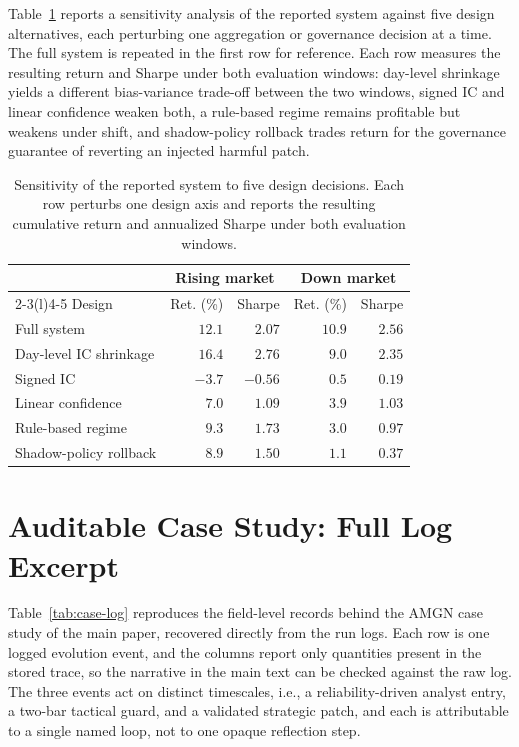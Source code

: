 \documentclass[letterpaper]{article}
\begin{document}
Table~\ref{tab:design} reports a sensitivity analysis of the reported
system against five design alternatives, each perturbing one aggregation
or governance decision at a time. The full system is repeated in the
first row for reference. Each row measures the resulting return and
Sharpe under both evaluation windows: day-level shrinkage yields a
different bias-variance trade-off between the two windows, signed IC and
linear confidence weaken both, a rule-based regime remains profitable
but weakens under shift, and shadow-policy rollback trades return for
the governance guarantee of reverting an injected harmful patch.

\begin{table}[tb]
\centering
\footnotesize
\setlength{\tabcolsep}{4pt}
\begin{tabular}{@{}l rr rr@{}}
\toprule
& \multicolumn{2}{c}{Rising market} & \multicolumn{2}{c}{Down market} \\
\cmidrule(lr){2-3}\cmidrule(l){4-5}
Design & Ret. (\%) & Sharpe & Ret. (\%) & Sharpe \\
\midrule
Full system            & $12.1$  & $2.07$  & $10.9$ & $2.56$ \\
Day-level IC shrinkage & $16.4$  & $2.76$  & $9.0$  & $2.35$ \\
Signed IC              & $-3.7$  & $-0.56$ & $0.5$  & $0.19$ \\
Linear confidence      & $7.0$   & $1.09$  & $3.9$  & $1.03$ \\
Rule-based regime      & $9.3$   & $1.73$  & $3.0$  & $0.97$ \\
Shadow-policy rollback & $8.9$   & $1.50$  & $1.1$  & $0.37$ \\
\bottomrule
\end{tabular}
\caption{Sensitivity of the reported system to five design decisions.
Each row perturbs one design axis and reports the resulting cumulative
return and annualized Sharpe under both evaluation windows.}
\label{tab:design}
\end{table}

\section{Auditable Case Study: Full Log Excerpt}
\label{app:case}

Table~\ref{tab:case-log} reproduces the field-level records behind the AMGN case
study of the main paper, recovered directly from the run logs. Each row is one
logged evolution event, and the columns report only quantities present in the stored
trace, so the narrative in the main text can be checked against the raw log. The
three events act on distinct timescales, i.e., a reliability-driven analyst
entry, a two-bar tactical guard, and a validated strategic patch, and each is
attributable
to a single named loop, not to one opaque reflection step.
\end{document}
